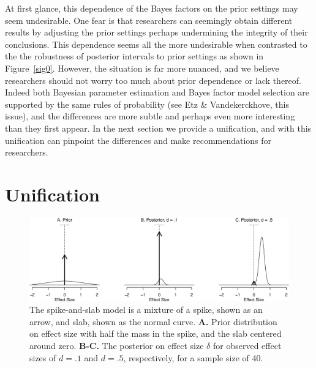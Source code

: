 At first glance, this dependence of the Bayes factors on the prior settings may seem undesirable.  One fear is that researchers can seemingly obtain different results by adjusting the prior settings perhaps undermining the integrity of their conclusions.  This dependence seems all the more undesirable when contrasted to the the robustness of posterior intervals to prior settings as shown in Figure~\ref{sig0}.  However, the situation is far more nuanced, and we believe researchers should not worry too much about prior dependence or lack thereof.  Indeed both Bayesian parameter estimation and Bayes factor model selection are supported by the same rules of probability (see Etz \& Vandekerckhove, this issue), and the differences are more subtle and perhaps even more interesting than they first appear.  In the next section we provide a unification, and with this unification can pinpoint the differences and make recommendations for researchers.

\section{Unification}

\begin{figure}[!t]
\includegraphics[width=\textwidth]{figs/bi4_fig4}
\caption{The spike-and-slab model is a mixture of a spike, shown as an arrow, and slab, shown as the normal curve.  \textbf{A.}  Prior distribution on effect size with half the mass in the spike, and the slab centered around zero.  \textbf{B-C.} The posterior on effect size $\delta$ for observed effect sizes of $d=.1$ and $d=.5$, respectively, for a sample size of 40.}
\label{fig:bi4:spikeSlab}
\end{figure}

